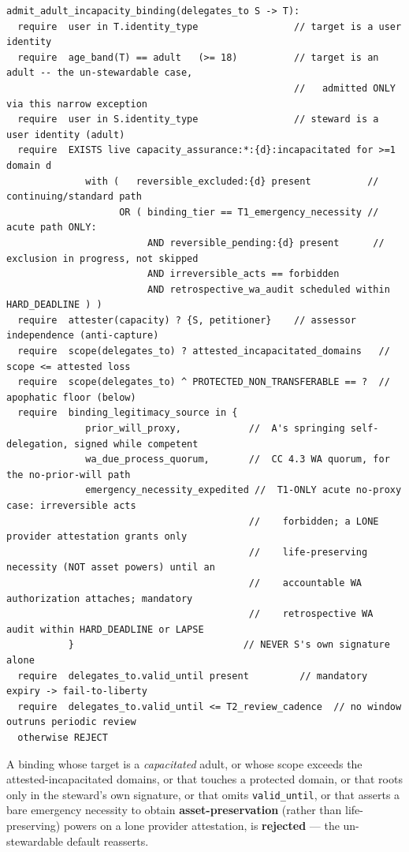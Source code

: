 \documentclass[11pt]{article}
\begin{document}
\begin{lstlisting}
admit_adult_incapacity_binding(delegates_to S -> T):
  require  user in T.identity_type                 // target is a user identity
  require  age_band(T) == adult   (>= 18)          // target is an adult -- the un-stewardable case,
                                                   //   admitted ONLY via this narrow exception
  require  user in S.identity_type                 // steward is a user identity (adult)
  require  EXISTS live capacity_assurance:*:{d}:incapacitated for >=1 domain d
              with (   reversible_excluded:{d} present          // continuing/standard path
                    OR ( binding_tier == T1_emergency_necessity // acute path ONLY:
                         AND reversible_pending:{d} present      //   exclusion in progress, not skipped
                         AND irreversible_acts == forbidden
                         AND retrospective_wa_audit scheduled within HARD_DEADLINE ) )
  require  attester(capacity) ? {S, petitioner}    // assessor independence (anti-capture)
  require  scope(delegates_to) ? attested_incapacitated_domains   // scope <= attested loss
  require  scope(delegates_to) ^ PROTECTED_NON_TRANSFERABLE == ?  // apophatic floor (below)
  require  binding_legitimacy_source in {
              prior_will_proxy,            //  A's springing self-delegation, signed while competent
              wa_due_process_quorum,       //  CC 4.3 WA quorum, for the no-prior-will path
              emergency_necessity_expedited //  T1-ONLY acute no-proxy case: irreversible acts
                                           //    forbidden; a LONE provider attestation grants only
                                           //    life-preserving necessity (NOT asset powers) until an
                                           //    accountable WA authorization attaches; mandatory
                                           //    retrospective WA audit within HARD_DEADLINE or LAPSE
           }                              // NEVER S's own signature alone
  require  delegates_to.valid_until present         // mandatory expiry -> fail-to-liberty
  require  delegates_to.valid_until <= T2_review_cadence  // no window outruns periodic review
  otherwise REJECT
\end{lstlisting}

A binding whose target is a \textit{capacitated} adult, or whose scope exceeds the attested-incapacitated domains, or that touches a protected domain, or that roots only in the steward's own signature, or that omits \texttt{valid\_until}, or that asserts a bare emergency necessity to obtain \textbf{asset-preservation} (rather than life-preserving) powers on a lone provider attestation, is \textbf{rejected} — the un-stewardable default reasserts.
\end{document}
